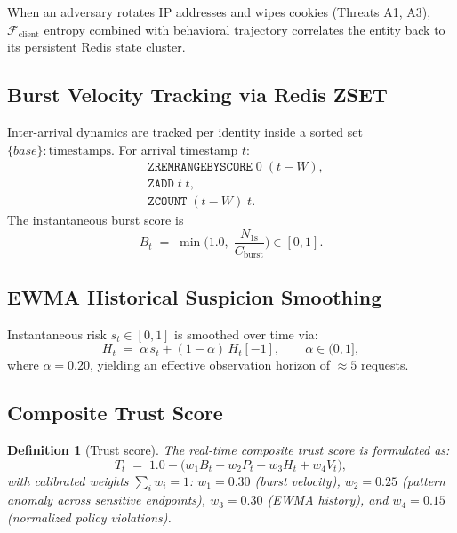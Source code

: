 \documentclass[journal,10pt]{IEEEtran}
\newtheorem{definition}{Definition}
\newcommand{\Fclient}{\mathcal{F}_{\mathrm{client}}}
\newcommand{\trust}{T_t}
\newcommand{\burst}{B_t}
\newcommand{\patt}{P_t}
\newcommand{\hist}{H_t}
\newcommand{\viol}{V_t}
\begin{document}
When an adversary rotates IP addresses and wipes cookies (Threats A1, A3), $\Fclient$ entropy combined with behavioral trajectory correlates the entity back to its persistent Redis state cluster.

\subsection{Burst Velocity Tracking via Redis ZSET}
Inter-arrival dynamics are tracked per identity inside a sorted set $\{base\}{:}\mathrm{timestamps}$. For arrival timestamp $t$:
\begin{equation}
\begin{aligned}
&\texttt{ZREMRANGEBYSCORE}\;0\;(t-W),\\
&\texttt{ZADD}\;t\;t,\\
&\texttt{ZCOUNT}\;(t-W)\;t.
\end{aligned}
\end{equation}
The instantaneous burst score is
\begin{equation}
\burst \;=\; \min\!\Big(1.0,\; \frac{N_{1\mathrm{s}}}{C_{\mathrm{burst}}}\Big)\in[0,1].
\label{eq:burst}
\end{equation}

\subsection{EWMA Historical Suspicion Smoothing}
Instantaneous risk $s_t\in[0,1]$ is smoothed over time via:
\begin{equation}
\hist \;=\; \alpha\,s_t + (1-\alpha)\,\hist[-1],\qquad \alpha\in(0,1],
\label{eq:ewma}
\end{equation}
where $\alpha=0.20$, yielding an effective observation horizon of $\approx 5$ requests.

\subsection{Composite Trust Score}
\begin{definition}[Trust score]
The real-time composite trust score is formulated as:
\begin{equation}
\trust \;=\; 1.0 - \big(w_1\burst + w_2\patt + w_3\hist + w_4\viol\big),
\end{equation}
with calibrated weights $\sum_i w_i = 1$: $w_1{=}0.30$ (burst velocity), $w_2{=}0.25$ (pattern anomaly across sensitive endpoints), $w_3{=}0.30$ (EWMA history), and $w_4{=}0.15$ (normalized policy violations).
\end{definition}
\end{document}
